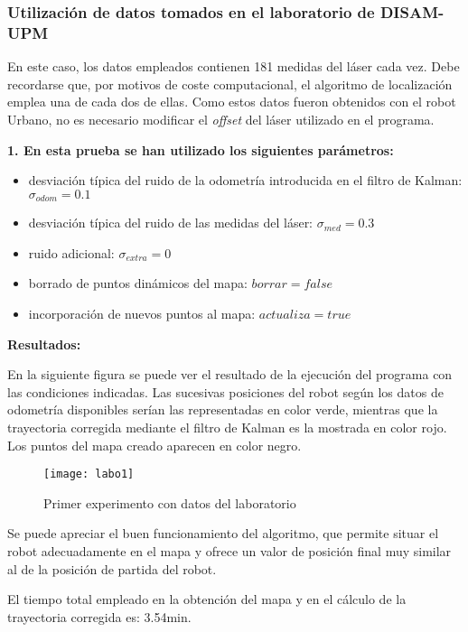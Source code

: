 \subsubsection{Utilización de datos tomados en el laboratorio de DISAM-UPM}
En este caso, los datos empleados contienen 181 medidas del láser cada vez. Debe recordarse que, por motivos de coste computacional, el algoritmo de localización emplea una de cada dos de ellas. Como estos datos fueron obtenidos con el robot Urbano, no es necesario modificar el \emph{offset} del láser utilizado en el programa.

\noindent
\textbf{\textbf{1.} En esta prueba se han utilizado los siguientes parámetros:}
\begin{itemize}
  \item desviación típica del ruido de la odometría introducida en el filtro de Kalman: $\sigma_{odom} = 0.1$
  \item desviación típica del ruido de las medidas del láser: $\sigma_{med} = 0.3$
  \item ruido adicional: $\sigma_{extra} = 0$
  \item borrado de puntos dinámicos del mapa: $borrar = false$
  \item incorporación de nuevos puntos al mapa: $actualiza = true$
\end{itemize}


\textbf{Resultados:}

En la siguiente figura se puede ver el resultado de la ejecución del programa con las condiciones indicadas. Las sucesivas posiciones del robot según los datos de odometría disponibles serían las representadas en color verde, mientras que la trayectoria corregida mediante el filtro de Kalman es la mostrada en color rojo. Los puntos del mapa creado aparecen en color negro.

\begin{figure}[h]
  \centering\texttt{[image: labo1]}\\
  \caption{Primer experimento con datos del laboratorio}\label{fg:labo1}
\end{figure}

Se puede apreciar el buen funcionamiento del algoritmo, que permite situar el robot adecuadamente en el mapa y ofrece un valor de posición final muy similar al de la posición de partida del robot.

El tiempo total empleado en la obtención del mapa y en el cálculo de la trayectoria corregida es: 3.54min.

